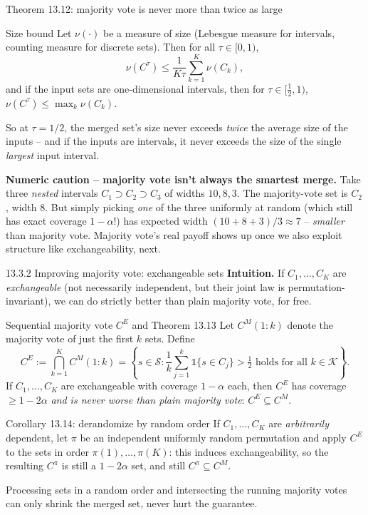 \documentclass[aspectratio=169,10pt]{beamer}
\newcommand{\calK}{\mathcal{K}}
\newcommand{\calS}{\mathcal{S}}
\begin{document}
\begin{frame}{Theorem 13.12: majority vote is never more than twice as large}
  \begin{block}{Size bound}
    Let $\nu(\cdot)$ be a measure of size (Lebesgue measure for intervals, counting measure for discrete sets). Then for all $\tau\in[0,1)$,
    \[
      \nu(C^\tau) \leq \frac{1}{K\tau}\sum_{k=1}^K \nu(C_k),
    \]
    and if the input sets are one-dimensional intervals, then for $\tau\in[\tfrac12,1)$, $\nu(C^\tau)\leq\max_k \nu(C_k)$.
  \end{block}
  So at $\tau=1/2$, the merged set's size never exceeds \emph{twice} the average size of the inputs -- and if the inputs are intervals, it never exceeds the size of the single \emph{largest} input interval.

  \vspace{0.2cm}
  \textbf{Numeric caution -- majority vote isn't always the smartest merge.} Take three \emph{nested} intervals $C_1\supset C_2\supset C_3$ of widths $10, 8, 3$. The majority-vote set is $C_2$, width $8$. But simply picking \emph{one} of the three uniformly at random (which still has exact coverage $1-\alpha$!) has expected width $(10+8+3)/3 \approx 7$ -- \emph{smaller} than majority vote. Majority vote's real payoff shows up once we also exploit structure like exchangeability, next.
\end{frame}

\begin{frame}{13.3.2 Improving majority vote: exchangeable sets}
  \textbf{Intuition.} If $C_1,\dots,C_K$ are \emph{exchangeable} (not necessarily independent, but their joint law is permutation-invariant), we can do strictly better than plain majority vote, for free.

  \begin{block}{Sequential majority vote $C^E$ and Theorem 13.13}
    Let $C^M(1{:}k)$ denote the majority vote of just the first $k$ sets. Define
    \[
      C^E := \bigcap_{k=1}^K C^M(1{:}k) = \left\{s\in\calS : \frac1k\sum_{j=1}^k\mathbb{1}\{s\in C_j\}>\tfrac12 \text{ holds for all } k\in\calK\right\}.
    \]
    If $C_1,\dots,C_K$ are exchangeable with coverage $1-\alpha$ each, then $C^E$ has coverage $\geq1-2\alpha$ \emph{and is never worse than plain majority vote}: $C^E \subseteq C^M$.
  \end{block}

  \begin{block}{Corollary 13.14: derandomize by random order}
    If $C_1,\dots,C_K$ are \emph{arbitrarily} dependent, let $\pi$ be an independent uniformly random permutation and apply $C^E$ to the sets in order $\pi(1),\dots,\pi(K)$: this induces exchangeability, so the resulting $C^\pi$ is still a $1-2\alpha$ set, and still $C^\pi\subseteq C^M$.
  \end{block}
  Processing sets in a random order and intersecting the running majority votes can only shrink the merged set, never hurt the guarantee.
\end{frame}
\end{document}
